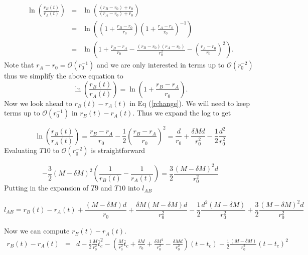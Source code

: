 \documentclass[aps,showpacs,onecolumn,floats,prd,superscriptaddress,nofootinbib]{revtex4-1}
\begin{document}
\begin{eqnarray}
	\ln \left( \frac{r_B(t)}{r_A(t)} \right) & = & \ln \left( \frac{(r_B - r_0) + r_0}{(r_A - r_0) + r_0} \right)	\nonumber	\\
	& = & \ln \left( \left( 1 + \frac{r_B - r_0}{r_0} \right) \left( 1 + \frac{r_A - r_0}{r_0} \right)^{-1} \right)	\nonumber	\\
	& = & \ln \left( 1 + \frac{r_B - r_A}{r_0} - \frac{(r_B - r_0)(r_A - r_0)}{r_0^2} - \left( \frac{r_A - r_0}{r_0} \right)^2 \right).
\end{eqnarray}
Note that $r_A - r_0 = \mathcal{O}(r_0^{-1})$ and we are only interested in terms up to $\mathcal{O}(r_0^{-2})$ thus we simplify the above equation to 
\begin{equation}
	\ln \left( \frac{r_B(t)}{r_A(t)} \right) = \ln \left( 1 + \frac{r_B - r_A}{r_0} \right).
\end{equation}
Now we look ahead to $r_B(t) - r_A(t)$ in Eq (\ref{rchange}). We will need to keep terms up to $\mathcal{O}(r_0^{-1})$ in $r_B(t) - r_A(t)$. Thus we expand the log to get

\begin{equation}
	\ln \left( \frac{r_B(t)}{r_A(t)} \right) = \frac{r_B - r_A}{r_0} - \frac{1}{2} \left( \frac{r_B - r_A}{r_0} \right)^2 = \frac{d}{r_0} + \frac{\delta M d}{r_0^2} - \frac{1}{2} \frac{d^2}{r_0^2} 
\end{equation}
Evaluating $T10$ to $\mathcal{O}(r_0^{-2})$ is straightforward

\begin{equation}
	- \frac{3}{2} (M - \delta M)^2 \left( \frac{1}{r_B(t)} - \frac{1}{r_A(t)} \right) = \frac{3}{2} \frac{(M -\delta M)^2d}{r_0^2}	\label{rsecond}
\end{equation}
Putting in the expansion of $T9$ and $T10$ into $l_{AB}$

\begin{equation}
	l_{AB} = r_B(t) - r_A(t) + \frac{(M - \delta M)d}{r_0} + \frac{\delta M (M - \delta M)d}{r_0^2} - \frac{1}{2} \frac{d^2(M- \delta M)}{r_0^2} + \frac{3}{2} \frac{(M - \delta M)^2d }{r_0^2}	\label{L1}
\end{equation}	

Now we can compute $r_B(t) - r_A(t)$. 
\begin{eqnarray}
	r_B(t) - r_A(t) & = & d - \frac{1}{2} \frac{M}{r_0^2} \bar{t}_c^2 - \left( \frac{M}{r_0^2} \bar{t}_c + \frac{\delta M}{r_0} + \frac{\delta M^2}{r_0^2} - \frac{\delta M d}{r_0^2} \right) (t - t_c) - \frac{1}{2} \frac{(M - \delta M)}{r_0^2} (t - t_c)^2 \label{rchange}
\end{eqnarray}
\end{document}
